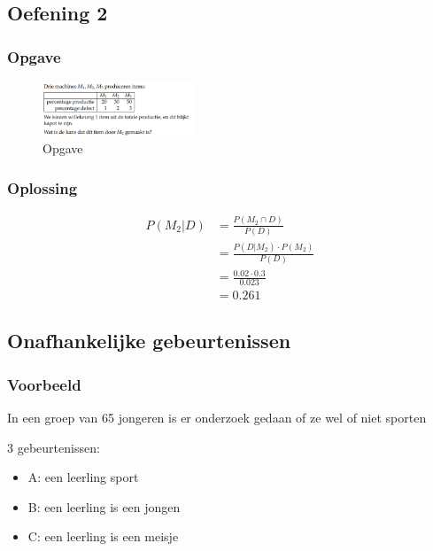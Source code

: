\documentclass{article}
\begin{document}
\subsection{Oefening 2}

\subsubsection{Opgave}

\begin{figure}[H]
    \centering
    \includegraphics[width=0.4\textwidth]{voorwaardelijke-kans-oef2.png}
    \caption{Opgave}
\end{figure}

\subsubsection{Oplossing}

\begin{center}
    \begin{align*}
        P(M_2 | D) & = \frac{P(M_2 \cap D)}{P(D)}\\
        & = \frac{P(D | M_2) \cdot P(M_2)}{P(D)}\\
        & = \frac{0.02 \cdot 0.3}{0.023}\\
        & = 0.261
    \end{align*}
\end{center}

\subsection{Onafhankelijke gebeurtenissen}

\subsubsection{Voorbeeld}

In een groep van 65 jongeren is er onderzoek gedaan of ze wel of niet sporten

3 gebeurtenissen:

\begin{itemize}
    \item A: een leerling sport
    \item B: een leerling is een jongen
    \item C: een leerling is een meisje
\end{itemize}
\end{document}
